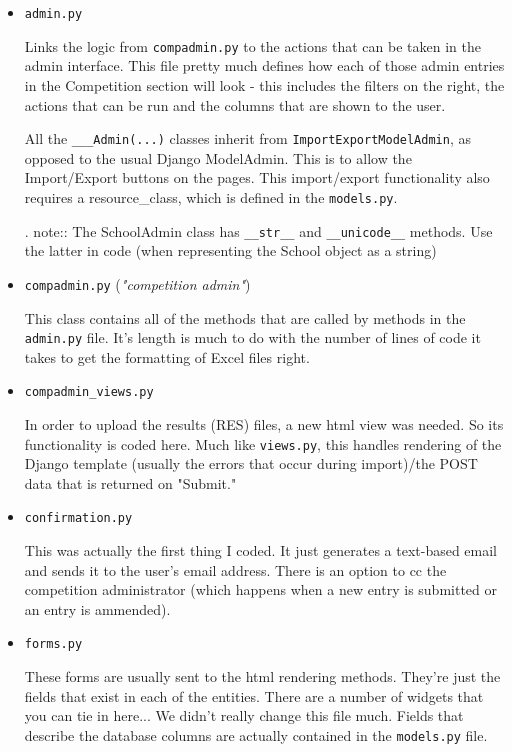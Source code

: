 \documentclass[a4paper,12pt]{article}
\begin{document}
\begin{itemize}

\item \verb|admin.py|

    Links the logic from \verb|compadmin.py| to the actions that can be taken in the admin interface. This file pretty much defines how each of those admin entries in the Competition section will look - this includes the filters on the right, the actions that can be run and the columns that are shown to the user. 
    
    All the \verb|___Admin(...)| classes inherit from \verb|ImportExportModelAdmin|, as opposed to the usual Django ModelAdmin. This is to allow the Import/Export buttons on the pages. This import/export functionality also requires a resource\_class, which is defined in the \verb|models.py|.
    
    . note:: The SchoolAdmin class has \verb|__str__| and \verb|__unicode__| methods. Use the latter in code (when representing the School object as a string)
    
\item \verb|compadmin.py| (\textit{"competition admin"})
	
	This class contains all of the methods that are called by methods in the \verb|admin.py| file. It's length is much to do with the number of lines of code it takes to get the formatting of Excel files right. 
	
	
	
\item \verb|compadmin_views.py|

	In order to upload the results (RES) files, a new html view was needed. So its functionality is coded here. Much like \verb|views.py|, this handles rendering of the Django template (usually the errors that occur during import)/the POST data that is returned on "Submit."

\item \verb|confirmation.py|
	
	This was actually the first thing I coded. It just generates a text-based email and sends it to the user's email address. There is an option to cc the competition administrator (which happens when a new entry is submitted or an entry is ammended).	

\item \verb|forms.py|

	These forms are usually sent to the html rendering methods. They're just the fields that exist in each of the entities. There are a number of widgets that you can tie in here... We didn't really change this file much. Fields that describe the database columns are actually contained in the \verb|models.py| file. 	
	

\end{itemize}
\end{document}

